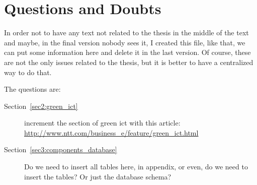 

\chapter*{Questions and Doubts}
    In order not to have any text not related to the thesis in the middle of the text and maybe, in the final version nobody sees it, I created this file, like that, we can put some information here and delete it in the last version. Of course, these are not the only issues related to the thesis, but it is better to have a centralized way to do that.

    The questions are:
\begin{description}
	\item [Section~\ref{sec2:green_ict}] increment the section of green ict with this article: \url{http://www.ntt.com/business_e/feature/green_ict.html}
	\item [Section~\ref{sec3:components_database}] Do we need to insert all tables here, in appendix, or even, do we need to insert the tables? Or just the database schema?
\end{description}
